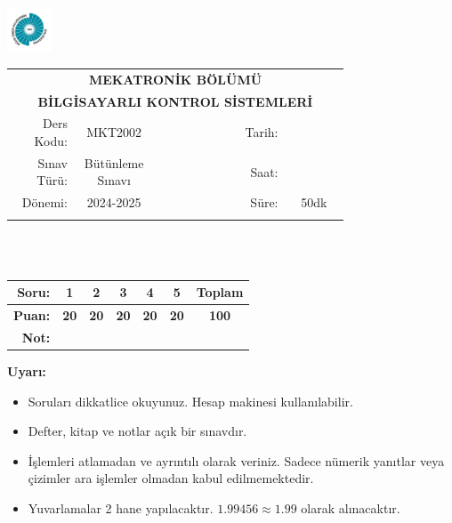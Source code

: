 \newcommand\UniversiteAdi{Niğde Ömer Halisdemir Üniversitesi}
\newcommand\BolumAdi{MEKATRONİK BÖLÜMÜ}
\newcommand\DersKodu{MKT2002}
\newcommand\DersAdi{BİLGİSAYARLI KONTROL SİSTEMLERİ}
\newcommand\SinavAdi{Bütünleme Sınavı}
\newcommand\SinavTarihi{ }
\newcommand\SinavSaati{ }
\newcommand\SinavSuresi{50dk}

\pagestyle{fancy}
\fancyhf{} %
\noindent \includegraphics[width=0.1\textwidth]{logo}
\begin{tabular}{
    p{0.15\linewidth}
    p{0.15\linewidth}
    p{0.2\linewidth}
    p{0.1\linewidth}
    p{0.15\linewidth}}
    \multicolumn{5}{c}{\textbf{\BolumAdi}}\\
    \multicolumn{5}{c}{\textbf{\DersAdi}}\\\hline
    \multicolumn{1}{|r|}{Ders Kodu:}&
    \multicolumn{1}{|c|}{\DersKodu}&
    \multicolumn{1}{|c|}{}& 
    \multicolumn{1}{|r|}{Tarih:}&
    \multicolumn{1}{|c|}{\SinavTarihi} \\\hline
    \multicolumn{1}{|r|}{Sınav Türü:}&
    \multicolumn{1}{|c|}{\SinavAdi}&  
    \multicolumn{1}{|c|}{}&
    \multicolumn{1}{|r|}{Saat:}&
    \multicolumn{1}{|c|}{\SinavSaati}\\\hline
    \multicolumn{1}{|r|}{Dönemi:}&
    \multicolumn{1}{|c|}{2024-2025}&
    \multicolumn{1}{|c|}{}&
    \multicolumn{1}{|r|}{Süre:}&
    \multicolumn{1}{|c|}{\SinavSuresi} \\\hline
    &&&&\\
\end{tabular}\\\\
\noindent\begin{center}
\begin{tabular}{|r|c|c|c|c|c|c|}\hline
    \textbf{Soru:}&
    \textbf{1}&
    \textbf{2}&
    \textbf{3}&
    \textbf{4}&
    \textbf{5}&
    \textbf{Toplam}\\\hline
    \textbf{Puan:}&
    \textbf{20}&
    \textbf{20}&
    \textbf{20}&
    \textbf{20}&
    \textbf{20}&
    \textbf{100}\\\hline
    \textbf{Not:}&&&&&&\\\hline
\end{tabular}\end{center}
\noindent\textbf{Uyarı:}
\begin{itemize}\bfseries
    \item Soruları dikkatlice okuyunuz. Hesap makinesi kullanılabilir.
    \item Defter, kitap ve notlar açık bir sınavdır.
    \item İşlemleri atlamadan ve ayrıntılı olarak veriniz. Sadece nümerik yanıtlar veya çizimler ara işlemler olmadan kabul edilmemektedir.
    \item Yuvarlamalar 2 hane yapılacaktır. $\mathbf{1.99456\approx1.99}$ olarak alınacaktır.
\end{itemize}

